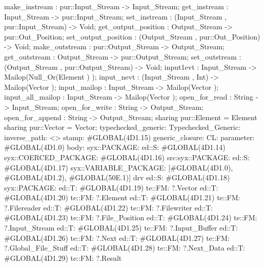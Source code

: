 {    make_instream : pur::Input_Stream -> Input_Stream;
    get_instream : Input_Stream -> pur::Input_Stream;
    set_instream : (Input_Stream , pur::Input_Stream) -> Void;
    get_output_position : Output_Stream -> pur::Out_Position;
    set_output_position : (Output_Stream , pur::Out_Position) -> Void;
    make_outstream : pur::Output_Stream -> Output_Stream;
    get_outstream : Output_Stream -> pur::Output_Stream;
    set_outstream : (Output_Stream , pur::Output_Stream) -> Void;
    input1evt : Input_Stream -> Mailop(Null_Or(Element ) );
    input_nevt : (Input_Stream , Int) -> Mailop(Vector );
    input_mailop : Input_Stream -> Mailop(Vector );
    input_all_mailop : Input_Stream -> Mailop(Vector );
    open_for_read : String -> Input_Stream;
    open_for_write : String -> Output_Stream;
    open_for_append : String -> Output_Stream;
    sharing pur::Element = Element
    sharing pur::Vector = Vector};
typechecked_generic:
Typechecked_Generic:
inverse_path: <>
stamp: #GLOBAL(4D1.15)
generic_closure:
CL:
parameter: #GLOBAL(4D1.0)
body: syx::PACKAGE:
        ed::S: #GLOBAL(4D1.14)
            syx::COERCED_PACKAGE:
                #GLOBAL(4D1.16)
                 src:syx::PACKAGE:
                        ed::S: #GLOBAL(4D1.17) syx::VARIABLE_PACKAGE: [#GLOBAL(4D1.0), #GLOBAL(4D1.2), #GLOBAL(50E.1)] drv
                            ed::S: #GLOBAL(4D1.18)
                             syx::PACKAGE:
                                    ed::T: #GLOBAL(4D1.19) te::FM: ?.Vector
                                    ed::T: #GLOBAL(4D1.20) te::FM: ?.Element
                                    ed::T: #GLOBAL(4D1.21) te::FM: ?.Filereader
                                    ed::T: #GLOBAL(4D1.22) te::FM: ?.Filewriter
                                    ed::T: #GLOBAL(4D1.23) te::FM: ?.File_Position
                                        ed::T: #GLOBAL(4D1.24)
                                         te::FM:
                                         ?.Input_Stream
                                        ed::T: #GLOBAL(4D1.25)
                                         te::FM:
                                         ?.Input_Buffer
                                        ed::T: #GLOBAL(4D1.26)
                                         te::FM:
                                         ?.Next
                                        ed::T: #GLOBAL(4D1.27)
                                         te::FM:
                                         ?.Global_File_Stuff
                                    ed::T: #GLOBAL(4D1.28) te::FM: ?.Next_Data
                                    ed::T: #GLOBAL(4D1.29) te::FM: ?.Result
